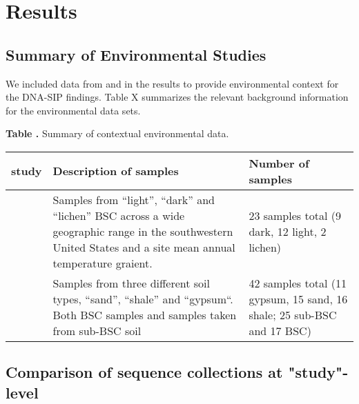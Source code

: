\section{Results}
\subsection{Summary of Environmental Studies}
We included data from \citet{Garcia_Pichel_2013} and \citet{Steven_2013}
in the results to provide environmental context for the DNA-SIP
findings. Table X summarizes the relevant background information
for the environmental data sets.
\begin{table}

\textbf{
\label{table:study_summary}
Table .
}
{Summary of contextual environmental data.} 

{\centering
\begin{tabular}{lp{6cm}p{6cm}}
\toprule
study & Description of samples & Number of samples \\ 
\midrule
\citet{Garcia_Pichel_2013} & Samples from ``light'', ``dark'' and ``lichen''
BSC across a wide geographic range in the southwestern United States and a site
mean annual temperature graient. & 23 samples total (9 dark, 12 light, 2
lichen) \\ \midrule 
\citet{Steven_2013} & Samples from three different soil types, ``sand'',
``shale'' and ``gypsum``. Both BSC samples and samples taken from sub-BSC soil
& 42 samples total (11 gypsum, 15 sand, 16 shale; 25 sub-BSC and 17 BSC) \\
\bottomrule
\end{tabular}}{}
\end{table}

\subsection{Comparison of sequence collections at "study"-level}

